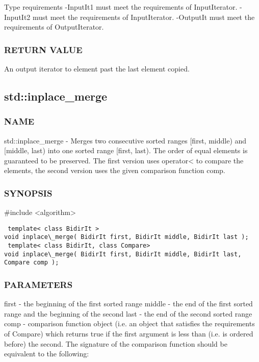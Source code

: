  Type requirements
 -InputIt1 must meet the requirements of InputIterator.
 -InputIt2 must meet the requirements of InputIterator.
 -OutputIt must meet the requirements of OutputIterator.

\subsubsection{RETURN VALUE}
An output iterator to element past the last element copied.



\subsection{std::inplace\_merge}

\subsubsection{NAME}
std::inplace\_merge - Merges two consecutive sorted ranges [first, middle) and [middle, last) into one sorted range [first, last). The order of equal elements is guaranteed to be preserved. The first version uses operator< to compare the elements, the second version uses the given comparison function comp.

\subsubsection{SYNOPSIS}
\#include <algorithm>

\begin{lstlisting}
 template< class BidirIt >
void inplace\_merge( BidirIt first, BidirIt middle, BidirIt last );
 template< class BidirIt, class Compare>
void inplace\_merge( BidirIt first, BidirIt middle, BidirIt last, Compare comp );
\end{lstlisting}

\subsubsection{PARAMETERS}
first - the beginning of the first sorted range
middle - the end of the first sorted range and the beginning of the second
last - the end of the second sorted range
comp - comparison function object (i.e. an object that satisfies the requirements of Compare) which returns true if the first argument is less than (i.e. is ordered before) the second.
The signature of the comparison function should be equivalent to the following:

